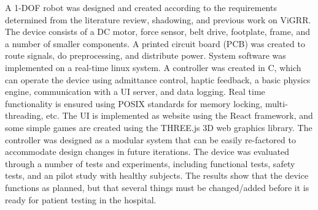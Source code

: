 \documentclass[12pt]{report}
\begin{document}
A 1-DOF robot was designed and created according to the requirements determined from the literature review, shadowing, and previous work on ViGRR. The device consists of a DC motor, force sensor, belt drive, footplate, frame, and a number of smaller components. A printed circuit board (PCB) was created to route signals, do preprocessing, and distribute power. System software was implemented on a real-time linux system. A controller was created in C, which can operate the device using admittance control, haptic feedback, a basic physics engine, communication with a UI server, and data logging. Real time functionality is ensured using POSIX standards for memory locking, multi-threading, etc. The UI is implemented as website using the React framework, and some simple games are created using the THREE.js 3D web graphics library. The controller was designed as a modular system that can be easily re-factored to accommodate design changes in future iterations. The device was evaluated through a number of tests and experiments, including functional tests, safety tests, and an pilot study with healthy subjects. The results show that the device functions as planned, but that several things must be changed/added before it is ready for patient testing in the hospital.
\end{document}
